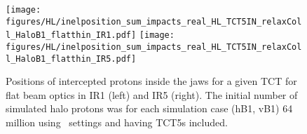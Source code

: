 \begin{figure}%
\begin{center}
  \texttt{[image: figures/HL/inelposition\_sum\_impacts\_real\_HL\_TCT5IN\_relaxColl\_HaloB1\_flatthin\_IR1.pdf]}
  \texttt{[image: figures/HL/inelposition\_sum\_impacts\_real\_HL\_TCT5IN\_relaxColl\_HaloB1\_flatthin\_IR5.pdf]}
\end{center}
 \caption{Positions of intercepted protons inside the jaws for a given TCT for flat beam optics in IR1 (left) and IR5 (right). The initial number of simulated halo protons was for each simulation case (hB1, vB1) 64 million using \twosigmaret~settings and having TCT5s included.
   \label{fig:inelflat}}
\end{figure}
